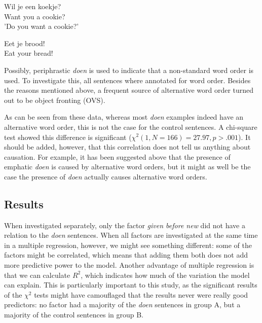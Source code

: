 \documentclass[12pt]{article}
\begin{document}
\begin{exe}
\ex \gll Wil je een koekje?\\
Want you a cookie?\\
'Do you want a cookie?'

\ex \gll Eet je brood!\\
Eat your bread!\\
\end{exe}

Possibly, periphrastic \emph{doen} is used to indicate that a non-standard word order is used. To investigate this, all sentences where annotated for word order. Besides the reasons mentioned above, a frequent source of alternative word order turned out to be object fronting (OVS).


\begin{table}[h] \footnotesize

\caption{\footnotesize Distribution of word order for the \emph{doen} sentences and the control sentences.}
\end{table}


As can be seen from these data, whereas most \emph{doen} examples indeed have an alternative word order, this is not the case for the control sentences. A chi-square test showed this difference is significant ($\chi^2(1, N=166) = 27.97, p > .001$). It should be added, however, that this correlation does not tell us anything about causation. For example, it has been suggested above that the presence of emphatic \emph{doen} is caused by alternative word orders, but it might as well be the case the presence of \emph{doen} actually causes alternative word orders.

\subsection{Results} \label{regressionresults}

When investigated separately, only the factor \emph{given before new} did not have a relation to the \emph{doen} sentences. When all factors are investigated at the same time in a multiple regression, however, we might see something different: some of the factors might be correlated, which means that adding them both does not add more predictive power to the model. Another advantage of multiple regression is that we can calculate $R^2$, which indicates how much of the variation the model can explain. This is particularly important to this study, as the significant results of the $\chi^2$ tests might have camouflaged that the results never were really good predictors: no factor had a majority of the \emph{doen} sentences in group A, but a majority of the control sentences in group B.
\end{document}
